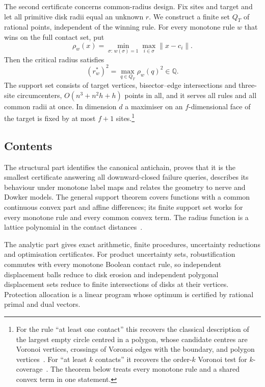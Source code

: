 The second certificate concerns common-radius design. Fix sites and target and let all primitive disk radii equal an unknown $r$. We construct a finite set $Q_T$ of rational points, independent of the winning rule. For every monotone rule $w$ that wins on the full contact set, put
\[
\rho_w(x)=\min_{\sigma:\,w(\sigma)=1}\max_{i\in\sigma}\|x-c_i\|.
\]
Then the critical radius satisfies
\begin{equation}\label{eq:overview-radius}
(r_w^*)^2=\max_{q\in Q_T}\rho_w(q)^2\in\mathbb Q.
\end{equation}
The support set consists of target vertices, bisector--edge intersections and three-site circumcenters, $O(n^3+n^2h+h)$ points in all, and it serves all rules and all common radii at once. In dimension $d$ a maximiser on an $f$-dimensional face of the target is fixed by at most $f+1$ sites.\footnote{For the rule ``at least one contact'' this recovers the classical description of the largest empty circle centred in a polygon, whose candidate centres are Voronoi vertices, crossings of Voronoi edges with the boundary, and polygon vertices~\cite{toussaint}. For ``at least $k$ contacts'' it recovers the order-$k$ Voronoi test for $k$-coverage~\cite{leekvoronoi,soye}. The theorem below treats every monotone rule and a shared convex term in one statement.}

\subsection{Contents}
The structural part identifies the canonical antichain, proves that it is the smallest certificate answering all downward-closed failure queries, describes its behaviour under monotone label maps and relates the geometry to nerve and Dowker models. The general support theorem covers functions with a common continuous convex part and affine differences; its finite support set works for every monotone rule and every common convex term. The radius function is a lattice polynomial in the contact distances~\cite{lattice,reliability-lattice}.

The analytic part gives exact arithmetic, finite procedures, uncertainty reductions and optimisation certificates. For product uncertainty sets, robustification commutes with every monotone Boolean contact rule, so independent displacement balls reduce to disk erosion and independent polygonal displacement sets reduce to finite intersections of disks at their vertices. Protection allocation is a linear program whose optimum is certified by rational primal and dual vectors.

